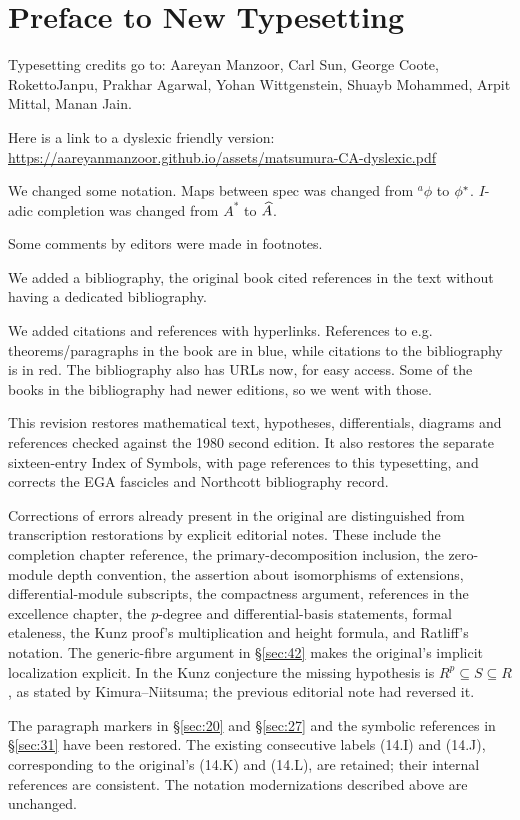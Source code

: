 \documentclass[../main]{subfiles}
\begin{document}
\chapter*{Preface to New Typesetting}

Typesetting credits go to: Aareyan Manzoor, Carl Sun, George Coote, RokettoJanpu, Prakhar Agarwal, Yohan Wittgenstein, Shuayb Mohammed, Arpit Mittal, Manan Jain. %

Here is a link to a dyslexic friendly version: \url{https://aareyanmanzoor.github.io/assets/matsumura-CA-dyslexic.pdf}

We changed some notation. Maps between spec was changed from $^a\phi$ to $\phi^\ast$. $I$-adic completion was changed from $A^\ast$ to $\widehat{A}$.

Some comments by editors were made in footnotes.

We added a bibliography, the original book cited references in the text without having a dedicated bibliography.

We added citations and references with hyperlinks. References to e.g. theorems/paragraphs in the book are in blue, while citations to the bibliography is in red. The bibliography also has URLs now, for easy access. Some of the books in the bibliography  had newer editions, so we went with those.

This revision restores mathematical text, hypotheses, differentials, diagrams and references checked against the 1980 second edition. It also restores the separate sixteen-entry Index of Symbols, with page references to this typesetting, and corrects the EGA fascicles and Northcott bibliography record.

Corrections of errors already present in the original are distinguished from transcription restorations by explicit editorial notes. These include the completion chapter reference, the primary-decomposition inclusion, the zero-module depth convention, the assertion about isomorphisms of extensions, differential-module subscripts, the compactness argument, references in the excellence chapter, the $p$-degree and differential-basis statements, formal etaleness, the Kunz proof's multiplication and height formula, and Ratliff's notation. The generic-fibre argument in \S\ref{sec:42} makes the original's implicit localization explicit. In the Kunz conjecture the missing hypothesis is $R^p\subseteq S\subseteq R$, as stated by Kimura--Niitsuma; the previous editorial note had reversed it.

The paragraph markers in \S\ref{sec:20} and \S\ref{sec:27} and the symbolic references in \S\ref{sec:31} have been restored. The existing consecutive labels (14.I) and (14.J), corresponding to the original's (14.K) and (14.L), are retained; their internal references are consistent. The notation modernizations described above are unchanged.
\end{document}
